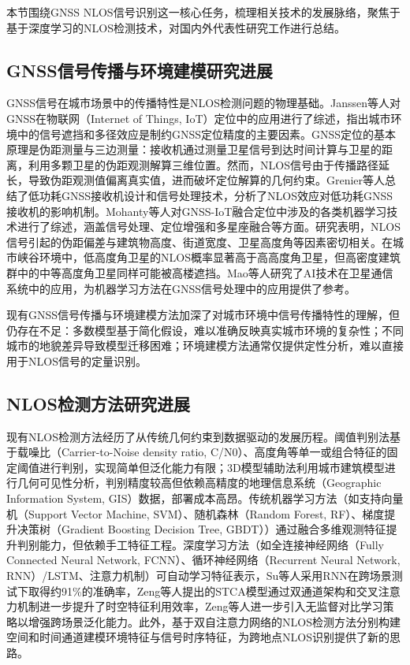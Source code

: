     本节围绕GNSS NLOS信号识别这一核心任务，梳理相关技术的发展脉络，聚焦于基于深度学习的NLOS检测技术，对国内外代表性研究工作进行总结。

\subsection{GNSS信号传播与环境建模研究进展}

    GNSS信号在城市场景中的传播特性是NLOS检测问题的物理基础。Janssen等人\cite{janssen2023survey}对GNSS在物联网（Internet of Things, IoT）定位中的应用进行了综述，指出城市环境中的信号遮挡和多径效应是制约GNSS定位精度的主要因素。GNSS定位的基本原理是伪距测量与三边测量：接收机通过测量卫星信号到达时间计算与卫星的距离，利用多颗卫星的伪距观测解算三维位置。然而，NLOS信号由于传播路径延长，导致伪距观测值偏离真实值，进而破坏定位解算的几何约束。Grenier等人\cite{grenier2023survey}总结了低功耗GNSS接收机设计和信号处理技术，分析了NLOS效应对低功耗GNSS接收机的影响机制。Mohanty等人\cite{mohanty2024survey}对GNSS-IoT融合定位中涉及的各类机器学习技术进行了综述，涵盖信号处理、定位增强和多星座融合等方面。研究表明，NLOS信号引起的伪距偏差与建筑物高度、街道宽度、卫星高度角等因素密切相关。在城市峡谷环境中，低高度角卫星的NLOS概率显著高于高高度角卫星，但高密度建筑群中的中等高度角卫星同样可能被高楼遮挡。Mao等人\cite{mao2024intelligent}研究了AI技术在卫星通信系统中的应用，为机器学习方法在GNSS信号处理中的应用提供了参考。

    现有GNSS信号传播与环境建模方法加深了对城市环境中信号传播特性的理解，但仍存在不足：多数模型基于简化假设，难以准确反映真实城市环境的复杂性；不同城市的地貌差异导致模型迁移困难；环境建模方法通常仅提供定性分析，难以直接用于NLOS信号的定量识别。

\subsection{NLOS检测方法研究进展}

    现有NLOS检测方法经历了从传统几何约束到数据驱动的发展历程。阈值判别法基于载噪比（Carrier-to-Noise density ratio, C/N0）、高度角等单一或组合特征的固定阈值进行判别，实现简单但泛化能力有限\cite{su2022nlos}；3D模型辅助法利用城市建筑模型进行几何可见性分析，判别精度较高但依赖高精度的地理信息系统（Geographic Information System, GIS）数据，部署成本高昂\cite{janssen2023survey}。传统机器学习方法（如支持向量机（Support Vector Machine, SVM）、随机森林（Random Forest, RF）、梯度提升决策树（Gradient Boosting Decision Tree, GBDT））通过融合多维观测特征提升判别能力，但依赖手工特征工程\cite{su2022nlos, xu2024ml_gnss}。深度学习方法（如全连接神经网络（Fully Connected Neural Network, FCNN）、循环神经网络（Recurrent Neural Network, RNN）/LSTM、注意力机制）可自动学习特征表示，Su等人\cite{su2022nlos}采用RNN在跨场景测试下取得约91\%的准确率，Zeng等人\cite{zeng2024spatiotemporal}提出的STCA模型通过双通道架构和交叉注意力机制进一步提升了时空特征利用效率，Zeng等人\cite{zeng2026environment}进一步引入无监督对比学习策略以增强跨场景泛化能力。此外，基于双自注意力网络的NLOS检测方法\cite{dual_self_attention2025}分别构建空间和时间通道建模环境特征与信号时序特征，为跨地点NLOS识别提供了新的思路。

